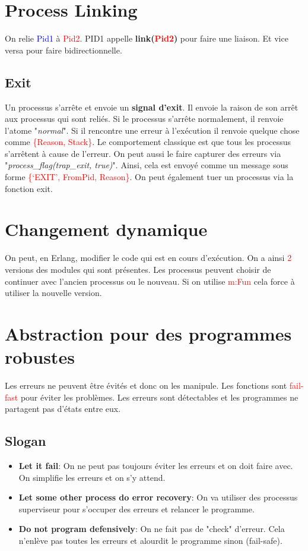 \documentclass{report}
\begin{document}
\section{Process Linking}
On relie \textcolor{blue}{Pid1} à \textcolor{red}{Pid2}. PID1 appelle \textbf{link(\textcolor{red}{Pid2})} pour faire une liaison. Et vice versa pour faire bidirectionnelle.

\subsection{Exit}
Un processus s'arrête et envoie un \textbf{signal d'exit}. Il envoie la raison de son arrêt aux processus qui sont reliés. Si le processus s'arrête normalement, il renvoie l'atome "\textit{normal}". Si il rencontre une erreur à l'exécution il renvoie quelque chose comme \textcolor{red}{\{Reason, Stack\}}. Le comportement classique est que tous les processus s'arrêtent à cause de l'erreur. On peut aussi le faire capturer des erreurs via "\textit{process\_flag(trap\_exit, true)}". Ainsi, cela est envoyé comme un message sous forme \textcolor{red}{\{‘EXIT’, FromPid, Reason\}}. On peut également tuer un processus via la fonction exit.

\section{Changement dynamique}
On peut, en Erlang, modifier le code qui est en cours d'exécution. On a ainsi \textcolor{red}{2} versions des modules qui sont présentes. Les processus peuvent choisir de continuer avec l'ancien processus ou le nouveau. Si on utilise \textcolor{red}{m:Fun} cela force à utiliser la nouvelle version. 

\section{Abstraction pour des programmes robustes}
Les erreurs ne peuvent être évités et donc on les manipule. Les fonctions sont \textcolor{red}{fail-fast} pour éviter les problèmes. Les erreurs sont détectables et les programmes ne partagent pas d'états entre eux.

\subsection{Slogan}
\begin{itemize}
\item \textbf{Let it fail}: On ne peut pas toujours éviter les erreurs et on doit faire avec. On simplifie les erreurs et on s'y attend.
\item \textbf{Let some other process do error recovery}: On va utiliser des processus superviseur pour s'occuper des erreurs et relancer le programme. 
\item \textbf{Do not program defensively}: On ne fait pas de "check" d'erreur. Cela n'enlève pas toutes les erreurs et alourdit le programme sinon (fail-safe).
\end{itemize}
\end{document}
